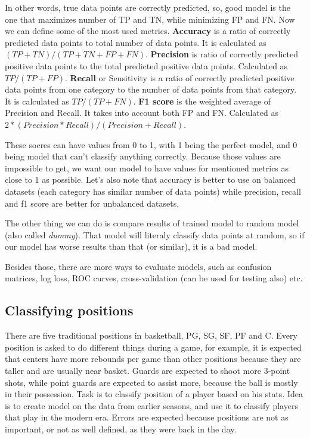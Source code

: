 \documentclass[a4paper]{article}
\begin{document}
In other words, true data points are correctly predicted, so, good model is the one that maximizes number of TP and TN, while minimizing FP and FN. Now we can define some of the most used metrics. \textbf{Accuracy} is a ratio of correctly predicted data points to total number of data points. It is calculated as $(TP + TN) / (TP + TN + FP + FN)$. \textbf{Precision} is ratio of correctly predicted positive data points to the total predicted positive data points. Calculated as $TP / (TP + FP)$. \textbf{Recall} or Sensitivity is a ratio of correctly predicted positive data points from one category to the number of data points from that category. It is calculated as $TP / (TP + FN)$. \textbf{F1 score} is the weighted average of Precision and Recall. It takes into account both FP and FN. Calculated as $2 * (Precision * Recall) / (Precision + Recall)$.

These socres can have values from 0 to 1, with 1 being the perfect model, and 0 being model that can't classify anything correctly. Because those values are impossible to get, we want our model to have values for mentioned metrics as close to 1 as possible. Let's also note that accuracy is better to use on balanced datasets (each category has similar number of data points) while precision, recall and f1 score are better for unbalanced datasets.

The other thing we can do is compare results of trained model to random model (also called \textit{dummy}). That model will literaly classify data points at random, so if our model has worse results than that (or similar), it is a bad model. 

Besides those, there are more ways to evaluate models, such as confusion matrices, log loss, ROC curves, cross-validation (can be used for testing also) etc.

\subsection{Classifying positions}
\label{subsec:pos_clf}

There are five traditional positions in basketball, PG, SG, SF, PF and C. Every position is asked to do different things during a game, for example, it is expected that centers have more rebounds per game than other positions because they are taller and are usually near basket. Guards are expected to shoot more 3-point shots, while point guards are expected to assist more, because the ball is mostly in their possession. Task is to classify position of a player based on his stats. Idea is to create model on the data from earlier seasons, and use it to classify players that play in the modern era. Errors are expected because positions are not as important, or not as well defined, as they were back in the day.
\end{document}

